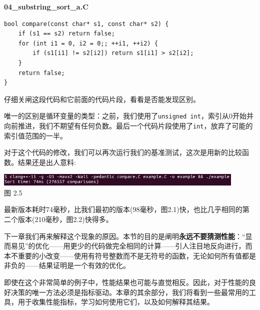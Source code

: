 \noindent
\textbf{04\_substring\_sort\_a.C}
\begin{lstlisting}[style=styleCXX]
bool compare(const char* s1, const char* s2) {
	if (s1 == s2) return false;
	for (int i1 = 0, i2 = 0;; ++i1, ++i2) {
		if (s1[i1] != s2[i2]) return s1[i1] > s2[i2];
	}
	return false;
}
\end{lstlisting}

仔细关闸这段代码和它前面的代码片段，看看是否能发现区别。

唯一的区别是循环变量的类型：之前，我们使用了\texttt{unsigned int}，索引从0开始并向前推进，我们不期望有任何负数。最后一个代码片段使用了\texttt{int}，放弃了可能的索引值范围的一半。

对于这个代码的修改，我们可以再次运行我们的基准测试，这次是用新的比较函数。结果还是出人意料:

\begin{center}
\includegraphics[width=0.9\textwidth]{content/1/chapter2/images/5.jpg}\\
图 2.5
\end{center}

最新版本耗时74毫秒，比我们最初的版本(98毫秒，图2.1)快，也比几乎相同的第二个版本(210毫秒，图2.2)快得多。

下一章我们再来解释这个现象的原因。本节的目的是阐明\textbf{永远不要猜测性能}：“显而易见”的优化——用更少的代码做完全相同的计算——引人注目地反向进行，而本不重要的小改变——使用有符号整数而不是无符号的函数，无论如何所有值都是非负的——结果证明是一个有效的优化。

即使在这个非常简单的例子中，性能结果也可能与直觉相反。因此，对于性能的良好决策的唯一方法必须是指标驱动。本章的其余部分，我们将看到一些最常用的工具，用于收集性能指标，学习如何使用它们，以及如何解释其结果。
